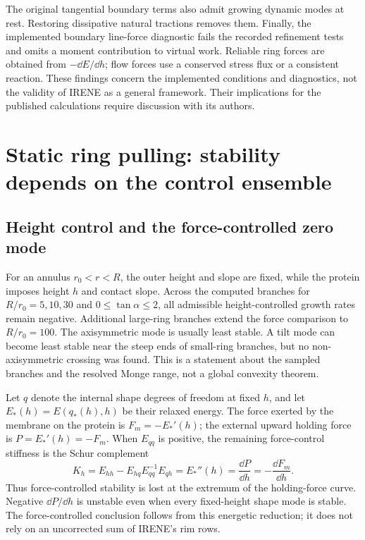 The original tangential boundary terms also admit growing dynamic modes at rest. Restoring dissipative natural tractions removes them. Finally, the implemented boundary line-force diagnostic fails the recorded refinement tests and omits a moment contribution to virtual work. Reliable ring forces are obtained from $-\dd E/\dd h$; flow forces use a conserved stress flux or a consistent reaction. These findings concern the implemented conditions and diagnostics, not the validity of IRENE as a general framework. Their implications for the published calculations require discussion with its authors.

\clearpage
\section{Static ring pulling: stability depends on the control ensemble}
\subsection{Height control and the force-controlled zero mode}
For an annulus $r_0<r<R$, the outer height and slope are fixed, while the protein imposes height $h$ and contact slope. Across the computed branches for $R/r_0=5,10,30$ and $0\leq\tan\alpha\leq2$, all admissible height-controlled growth rates remain negative. Additional large-ring branches extend the force comparison to $R/r_0=100$. The axisymmetric mode is usually least stable. A tilt mode can become least stable near the steep ends of small-ring branches, but no non-axisymmetric crossing was found. This is a statement about the sampled branches and the resolved Monge range, not a global convexity theorem.

Let $q$ denote the internal shape degrees of freedom at fixed $h$, and let $E_*(h)=E(q_*(h),h)$ be their relaxed energy. The force exerted by the membrane on the protein is $F_m=-E_*'(h)$; the external upward holding force is $P=E_*'(h)=-F_m$. When $E_{qq}$ is positive, the remaining force-control stiffness is the Schur complement
\begin{equation}
K_h=E_{hh}-E_{hq}E_{qq}^{-1}E_{qh}=E_*''(h)=\frac{\dd P}{\dd h}=-\frac{\dd F_m}{\dd h}.\label{eq:schur}
\end{equation}
Thus force-controlled stability is lost at the extremum of the holding-force curve. Negative $\dd P/\dd h$ is unstable even when every fixed-height shape mode is stable. The force-controlled conclusion follows from this energetic reduction; it does not rely on an uncorrected sum of IRENE's rim rows.

